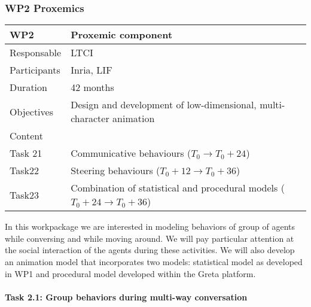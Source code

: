 
\subsubsection{WP2 Proxemics}


\begin{center}
\begin{tabular}{|l|l|}\hline
WP2 &  Proxemic component \\\hline
Responsable &  LTCI  \\\hline
Participants &  Inria, LIF\\\hline
Duration  &   42 months \\\hline
Objectives &  Design and development of low-dimensional, multi-character  animation \\\hline
Content &  \\\hline
Task 21 & Communicative behaviours   ($T_0 \rightarrow  T_0+24$)\\\hline
Task22 &  Steering behaviours  ($T_0+12 \rightarrow  T_0+36$) \\\hline
Task23 &  Combination of statistical and procedural models    ($T_0 +24 \rightarrow  T_0+36$) \\\hline
\end{tabular}
\end{center}

In this workpackage we are interested in modeling behaviors of group of agents while conversing and while moving around. We will pay particular attention at the social interaction of the agents during these activities. We will also develop an animation model that incorporates two models: statistical model as developed in WP1 and procedural model developed within the Greta platform.


\paragraph{Task 2.1: Group behaviors during multi-way conversation}


